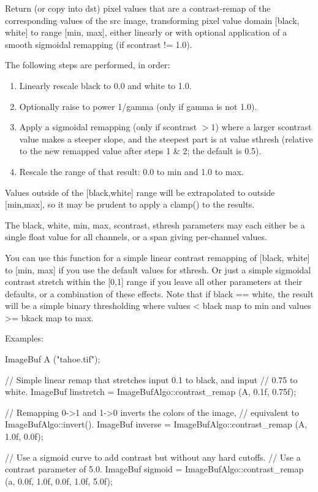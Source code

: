 Return (or copy into {\cf dst}) pixel values that are a contrast-remap
of the corresponding values of the {\cf src} image, transforming pixel
value domain [black, white] to range [min, max], either linearly or with
optional application of a smooth sigmoidal remapping (if scontrast != 1.0).

\noindent The following steps are performed, in order:

\begin{enumerate}
\item Linearly rescale {\cf black} to 0.0 and {\cf white} to 1.0.
\item Optionally raise to power 1/gamma (only if {\cf gamma} is not 1.0).
\item Apply a sigmoidal remapping (only if {\cf scontrast} $> 1$) where a larger
   {\cf scontrast} value makes a steeper slope, and the steepest part is at
   value {\cf sthresh} (relative to the new remapped value after steps 1 \& 2;
   the default is 0.5).
\item Rescale the range of that result: 0.0 to min and 1.0 to max.
\end{enumerate}

Values outside of the [black,white] range will be extrapolated to
outside [min,max], so it may be prudent to apply a clamp() to the
results.

The black, white, min, max, scontrast, sthresh parameters may each
either be a single float value for all channels, or a span giving
per-channel values.

You can use this function for a simple linear contrast remapping of
[black, white] to [min, max] if you use the default values for sthresh.
Or just a simple sigmoidal contrast stretch within the [0,1] range if
you leave all other parameters at their defaults, or a combination of
these effects. Note that if black == white, the result will be a simple
binary thresholding where values < black map to min and values >= bkack
map to max.

\smallskip
\noindent Examples:
\begin{code}
    ImageBuf A ("tahoe.tif");

    // Simple linear remap that stretches input 0.1 to black, and input
    // 0.75 to white.
    ImageBuf linstretch = ImageBufAlgo::contrast_remap (A, 0.1f, 0.75f);

    // Remapping 0->1 and 1->0 inverts the colors of the image,
    // equivalent to ImageBufAlgo::invert().
    ImageBuf inverse = ImageBufAlgo::contrast_remap (A, 1.0f, 0.0f);

    // Use a sigmoid curve to add contrast but without any hard cutoffs.
    // Use a contrast parameter of 5.0.
    ImageBuf sigmoid = ImageBufAlgo::contrast_remap (a, 0.0f, 1.0f,
                                                     0.0f, 1.0f, 5.0f);
\end{code}

